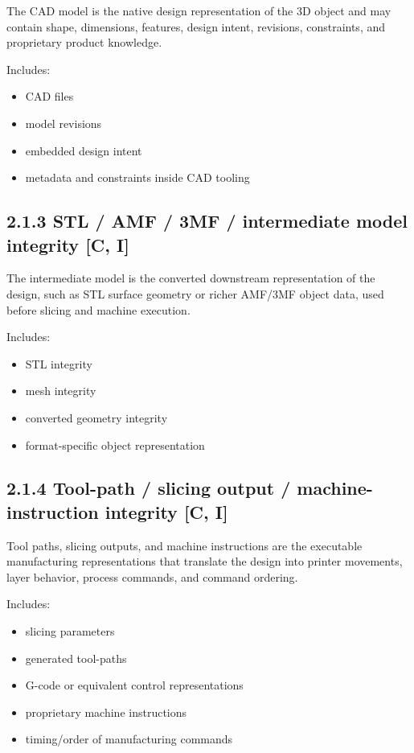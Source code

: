 \documentclass[10pt,a4paper,oneside]{report}
\begin{document}
The CAD model is the native design representation of the 3D object and may contain shape, dimensions, features, design intent, revisions, constraints, and proprietary product knowledge.

Includes:

\begin{itemize}
\item CAD files
\item model revisions
\item embedded design intent
\item metadata and constraints inside CAD tooling
\end{itemize}


\subsection{2.1.3 STL / AMF / 3MF / intermediate model integrity [C, I]}


The intermediate model is the converted downstream representation of the design, such as STL surface geometry or richer AMF/3MF object data, used before slicing and machine execution.

Includes:

\begin{itemize}
\item STL integrity
\item mesh integrity
\item converted geometry integrity
\item format-specific object representation
\end{itemize}


\subsection{2.1.4 Tool-path / slicing output / machine-instruction integrity [C, I]}


Tool paths, slicing outputs, and machine instructions are the executable manufacturing representations that translate the design into printer movements, layer behavior, process commands, and command ordering.

Includes:

\begin{itemize}
\item slicing parameters
\item generated tool-paths
\item G-code or equivalent control representations
\item proprietary machine instructions
\item timing/order of manufacturing commands
\end{itemize}
\end{document}
